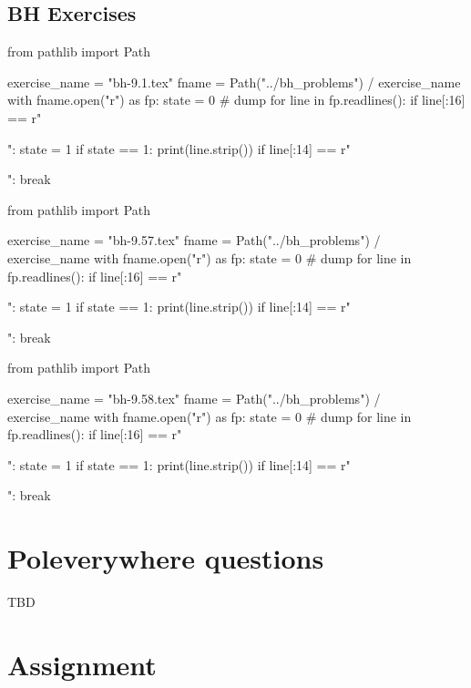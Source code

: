 \subsection{BH Exercises}
\label{sec:bh-exercises-1}

\begin{pycode}
from pathlib import Path

exercise_name = "bh-9.1.tex"
fname = Path("../bh_problems") / exercise_name
with fname.open("r") as fp:
    state = 0  # dump
    for line in fp.readlines():
        if line[:16] == r"\begin{exercise}":
            state = 1
        if state == 1:
            print(line.strip())
        if line[:14] == r"\end{exercise}":
            break
\end{pycode}


\begin{pycode}
from pathlib import Path

exercise_name = "bh-9.57.tex"
fname = Path("../bh_problems") / exercise_name
with fname.open("r") as fp:
    state = 0  # dump
    for line in fp.readlines():
        if line[:16] == r"\begin{exercise}":
            state = 1
        if state == 1:
            print(line.strip())
        if line[:14] == r"\end{exercise}":
            break
\end{pycode}


\begin{pycode}
from pathlib import Path

exercise_name = "bh-9.58.tex"
fname = Path("../bh_problems") / exercise_name
with fname.open("r") as fp:
    state = 0  # dump
    for line in fp.readlines():
        if line[:16] == r"\begin{exercise}":
            state = 1
        if state == 1:
            print(line.strip())
        if line[:14] == r"\end{exercise}":
            break
\end{pycode}



\section{Poleverywhere questions}
\label{sec:polev-quest}


TBD


\section{Assignment}
\label{sec:assignment}

%






